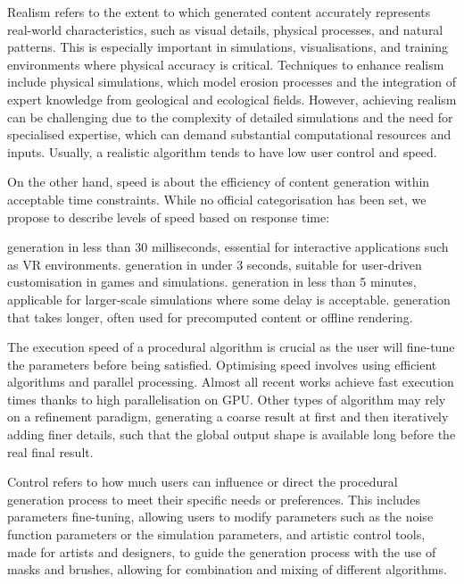 
Realism refers to the extent to which generated content accurately represents real-world characteristics, such as visual details, physical processes, and natural patterns. This is especially important in simulations, visualisations, and training environments where physical accuracy is critical. Techniques to enhance realism include physical simulations, which model erosion processes and the integration of expert knowledge from geological and ecological fields. However, achieving realism can be challenging due to the complexity of detailed simulations and the need for specialised expertise, which can demand substantial computational resources and inputs. Usually, a realistic algorithm tends to have low user control and speed.

On the other hand, speed is about the efficiency of content generation within acceptable time constraints. While no official categorisation has been set, we propose to describe levels of speed based on response time:
\begin{Itemize}
     generation in less than 30 milliseconds, essential for interactive applications such as VR environments.
     generation in under 3 seconds, suitable for user-driven customisation in games and simulations.
     generation in less than 5 minutes, applicable for larger-scale simulations where some delay is acceptable.
     generation that takes longer, often used for precomputed content or offline rendering.
\end{Itemize}

The execution speed of a procedural algorithm is crucial as the user will fine-tune the parameters before being satisfied.
Optimising speed involves using efficient algorithms and parallel processing. Almost all recent works achieve fast execution times thanks to high parallelisation on GPU. Other types of algorithm may rely on a refinement paradigm, generating a coarse result at first and then iteratively adding finer details, such that the global output shape is available long before the real final result.

Control refers to how much users can influence or direct the procedural generation process to meet their specific needs or preferences. This includes parameters fine-tuning, allowing users to modify parameters such as the noise function parameters or the simulation parameters, and artistic control tools, made for artists and designers, to guide the generation process with the use of masks and brushes, allowing for combination and mixing of different algorithms.


